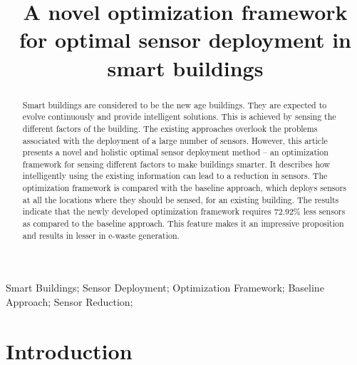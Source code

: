 \documentclass[]{interact}
\theoremstyle{plain}%
\theoremstyle{definition}
\theoremstyle{remark}
\begin{document}

\title{A novel optimization framework for optimal sensor deployment in smart buildings }

\author{
}

\maketitle

\begin{abstract}
  Smart buildings are considered to be the new age buildings.
  They are expected to evolve continuously and provide intelligent solutions.
  This is achieved by sensing the different factors of the building.
  The existing approaches overlook the problems associated with the deployment of a large number of sensors.
  However, this article presents a novel and holistic optimal sensor deployment method -- an optimization framework for sensing different factors to make buildings smarter.
  It describes how intelligently using the existing information can lead to a reduction in sensors.
  The optimization framework is compared with the baseline approach, which deploys sensors at all the locations where they should be sensed, for an existing building.
  The results indicate that the newly developed optimization framework requires 72.92\% less sensors as compared to the baseline approach.
  This feature makes it an impressive proposition and results in lesser in e-waste generation. 
\end{abstract}

\begin{keywords}
Smart Buildings; Sensor Deployment; Optimization Framework; Baseline Approach; Sensor Reduction;
\end{keywords}

\section{Introduction}
\end{document}
